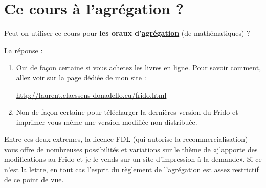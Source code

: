 
\section*{Ce cours à l'agrégation ?}

Peut-on utiliser ce cours pour \textbf{les oraux d'\href{http://agreg.org/}{agrégation}} (de mathématiques) ?

La réponse :
\begin{enumerate}
    \item
        Oui de façon certaine si vous achetez les livres en ligne. Pour savoir comment, allez voir sur la page dédiée de mon site :
        \begin{center}
            \url{http://laurent.claessens-donadello.eu/frido.html}
        \end{center}
    \item
        Non de façon certaine pour télécharger la dernières version du Frido et imprimer vous-même une version modifiée non distribuée.
\end{enumerate}
Entre ces deux extremes, la licence FDL (qui autorise la recommercialisation) vous offre de nombreuses possibilités et variations sur le thème de «j'apporte des modifications au Frido et je le vends sur un site d'impression à la demande». Si ce n'est la lettre, en tout cas l'esprit du règlement de l'agrégation est assez restrictif de ce point de vue.

